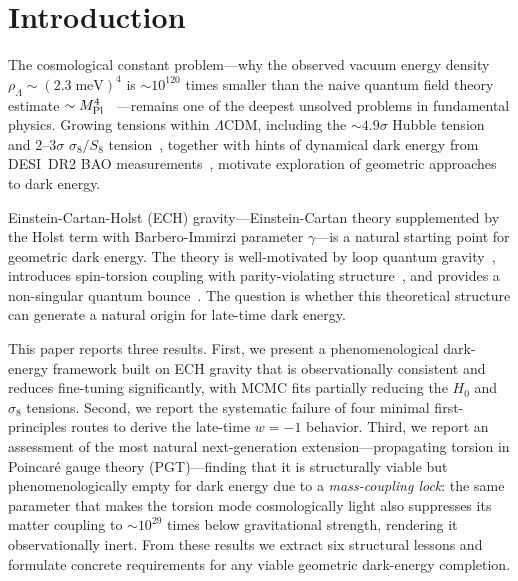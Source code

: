 \documentclass[aps,prd,twocolumn,superscriptaddress,showpacs,preprintnumbers,
  nofootinbib,longbibliography,floatfix]{revtex4-2}
\newcommand{\MPl}{M_{\rm Pl}}
\newcommand{\BI}{\gamma}
\begin{document}

\maketitle
\tableofcontents



\section{Introduction}\label{sec:intro}

The cosmological constant problem---why the observed vacuum energy density
$\rho_\Lambda \sim (2.3\;\text{meV})^4$ is $\sim 10^{120}$ times smaller
than the naive quantum field theory estimate $\sim \MPl^4$~\cite{Weinberg1989}%
---remains one of the deepest unsolved problems in fundamental physics.
Growing tensions within $\Lambda$CDM, including the ${\sim}4.9\sigma$
Hubble tension~\cite{Riess2022,Planck2018params} and $2$--$3\sigma$
$\sigma_8/S_8$ tension~\cite{KiDS2021,DES2024}, together with hints of
dynamical dark energy from DESI~DR2 BAO
measurements~\cite{DESI2024,DESI2025DR2}, motivate exploration of
geometric approaches to dark energy.

Einstein-Cartan-Holst (ECH) gravity---Einstein-Cartan theory supplemented
by the Holst term with Barbero-Immirzi parameter $\BI$---is a natural
starting point for geometric dark energy. The theory is well-motivated by
loop quantum gravity~\cite{Ashtekar2011}, introduces spin-torsion coupling
with parity-violating structure~\cite{Freidel2005,Mercuri2006}, and
provides a non-singular quantum bounce~\cite{Poplawski2012}. The question
is whether this theoretical structure can generate a natural origin for
late-time dark energy.

This paper reports three results. First, we present a phenomenological
dark-energy framework built on ECH gravity that is observationally
consistent and reduces fine-tuning significantly, with MCMC fits partially
reducing the $H_0$ and $\sigma_8$ tensions. Second, we report the
systematic failure of four minimal first-principles routes to derive
the late-time $w = -1$ behavior. Third, we report an assessment
of the most natural next-generation extension---propagating torsion in
Poincar\'e gauge theory (PGT)---finding that it is structurally viable but
phenomenologically empty for dark energy due to a \textit{mass-coupling
lock}: the same parameter that makes the torsion mode cosmologically
light also suppresses its matter coupling to $\sim\!10^{29}$ times below
gravitational strength, rendering it observationally inert. From these
results we extract six structural lessons and formulate concrete
requirements for any viable geometric dark-energy completion.
\end{document}
